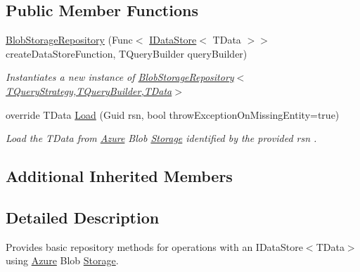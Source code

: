 \subsection*{Public Member Functions}
\begin{DoxyCompactItemize}
\item 
\hyperlink{classCqrs_1_1Azure_1_1BlobStorage_1_1Repositories_1_1BlobStorageRepository_a11ec03d2f22e21b2a84556fd26077909_a11ec03d2f22e21b2a84556fd26077909}{Blob\+Storage\+Repository} (Func$<$ \hyperlink{interfaceCqrs_1_1DataStores_1_1IDataStore}{I\+Data\+Store}$<$ T\+Data $>$$>$ create\+Data\+Store\+Function, T\+Query\+Builder query\+Builder)
\begin{DoxyCompactList}\small\item\em Instantiates a new instance of \hyperlink{classCqrs_1_1Azure_1_1BlobStorage_1_1Repositories_1_1BlobStorageRepository_a11ec03d2f22e21b2a84556fd26077909_a11ec03d2f22e21b2a84556fd26077909}{Blob\+Storage\+Repository$<$\+T\+Query\+Strategy,\+T\+Query\+Builder,\+T\+Data$>$} \end{DoxyCompactList}\item 
override T\+Data \hyperlink{classCqrs_1_1Azure_1_1BlobStorage_1_1Repositories_1_1BlobStorageRepository_a7c5a3ca4d92cf4954508fb3e583eb49e_a7c5a3ca4d92cf4954508fb3e583eb49e}{Load} (Guid rsn, bool throw\+Exception\+On\+Missing\+Entity=true)
\begin{DoxyCompactList}\small\item\em Load the {\itshape T\+Data}  from \hyperlink{namespaceCqrs_1_1Azure}{Azure} Blob \hyperlink{namespaceCqrs_1_1Azure_1_1Storage}{Storage} identified by the provided {\itshape rsn} . \end{DoxyCompactList}\end{DoxyCompactItemize}
\subsection*{Additional Inherited Members}


\subsection{Detailed Description}
Provides basic repository methods for operations with an I\+Data\+Store$<$\+T\+Data$>$ using \hyperlink{namespaceCqrs_1_1Azure}{Azure} Blob \hyperlink{namespaceCqrs_1_1Azure_1_1Storage}{Storage}. 


